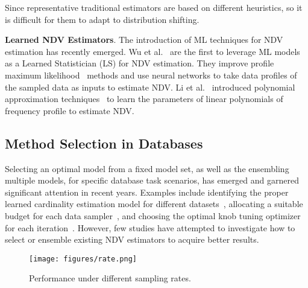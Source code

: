 Since representative traditional estimators are based on different heuristics, so it is difficult for them to adapt to distribution shifting.


\noindent\textbf{Learned NDV Estimators}. The introduction of ML techniques for NDV estimation has recently emerged. Wu et al.~\cite{ls_wu2022learning} are the first to leverage ML models as a Learned Statistician (LS) for NDV estimation. They improve profile maximum likelihood~\cite{apml_acharya2017unified,pml_orlitsky2004modeling,apml_pavlichin2019approximate} methods and use neural networks to take data profiles of the sampled data as inputs to estimate NDV. Li et al.~\cite{li2024learning} introduced polynomial approximation techniques~\cite{hao2019unified,wu2019chebyshev} to learn the parameters of linear polynomials of frequency profile to estimate NDV. 


\subsection{Method Selection in Databases}



Selecting an optimal model from a fixed model set, as well as the ensembling multiple models, for specific database task scenarios, has emerged and garnered significant attention in recent years. Examples include identifying the proper learned cardinality estimation model for different datasets~\cite{autoce}, allocating a suitable budget for each data sampler~\cite{pengOneSizeDoes2022a}, and choosing the optimal knob tuning optimizer for each iteration~\cite{zhang2024efficient}. 
However, few studies have attempted to investigate how to select or ensemble existing NDV estimators to acquire better results. 

\begin{figure}[t]
    \centering
    \texttt{[image: figures/rate.png]}
    \caption{{Performance under different sampling rates.}}
    \label{fig:samplingrates}
\end{figure}

